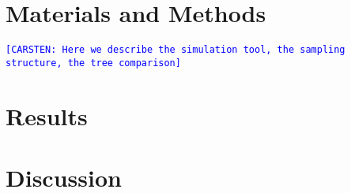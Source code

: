 \documentclass[12pt,letter]{scrartcl}
\newcommand{\comCM}[1]{\textcolor{blue}{\texttt{[CARSTEN: #1]}}}
\begin{document}

%

%

\section{Materials and Methods}

\comCM{Here we describe the simulation tool, the sampling structure, the tree comparison}


\section{Results}

\section{Discussion}
\end{document}
